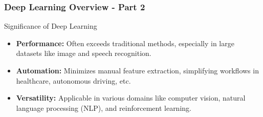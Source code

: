 \documentclass[aspectratio=169]{beamer}
\begin{document}
\begin{frame}[fragile]
    \frametitle{Deep Learning Overview - Part 2}
    \begin{block}{Significance of Deep Learning}
        \begin{itemize}
            \item \textbf{Performance:} Often exceeds traditional methods, especially in large datasets like image and speech recognition.
            \item \textbf{Automation:} Minimizes manual feature extraction, simplifying workflows in healthcare, autonomous driving, etc.
            \item \textbf{Versatility:} Applicable in various domains like computer vision, natural language processing (NLP), and reinforcement learning.
        \end{itemize}
    \end{block}
\end{frame}
\end{document}
